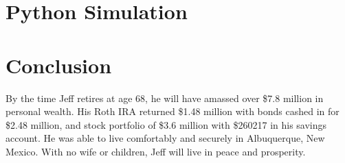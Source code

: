 \documentclass[12pt]{article}
\begin{document}
\newpage
\section{Python Simulation}



\section{Conclusion}

By the time Jeff retires at age 68, he will have amassed  over \$7.8 million in personal wealth. 
His Roth IRA returned \$1.48 million with bonds cashed in for \$2.48 million, and stock portfolio of \$3.6 million with \$260217 in his savings account. He was able to live comfortably and securely in Albuquerque, New Mexico. 
With no wife or children, Jeff will live in peace and prosperity.

\newpage
\printbibliography
\end{document}
